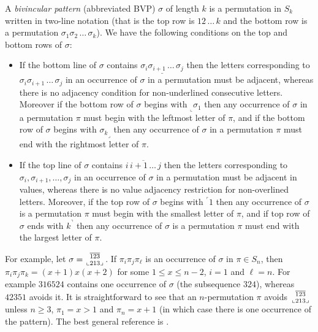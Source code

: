 \documentclass[a4paper]{llncs}
\newcommand{\pmotif}{\sigma}
\newcommand\BV[2]{\genfrac{}{}{0pt}{}{#1}{#2}}
\newcommand{\x}{X}
\newcommand{\y}{Y}
\begin{document}
A \emph{bivincular pattern} (abbreviated BVP) $\sigma$
of length $k$ is a permutation in $S_k$ written in
two-line notation
(that is the top row is $12\,\ldots\,k$ and the bottom row
is a permutation $\sigma_1\sigma_2\,\ldots\,\sigma_k$).
We have the following conditions on the top and bottom rows
of $\sigma$:
\begin{itemize}
	\item
	If the bottom line of $\sigma$ contains
	$\underline{\sigma_i\sigma_{i+1}\,\ldots\,\sigma_j}$
	then the letters corresponding to
	$\sigma_i\sigma_{i+1}\,\ldots\,\sigma_j$ in an occurrence of
	$\sigma$ in a permutation must be adjacent, whereas there is
	no adjacency condition for
	non-underlined consecutive letters.
	Moreover if the bottom row of $\sigma$ begins with
	$_\llcorner{\sigma_1}$ then any occurrence of $\sigma$
	in a permutation $\pi$ must begin with the leftmost
	letter of $\pi$,
	and
	if the bottom row of $\sigma$ begins with
	${\sigma_k}_\lrcorner$ then any occurrence of $\sigma$
	in a permutation $\pi$ must end with the rightmost
	letter of $\pi$.
	\item
	If the top line of $\sigma$ contains
	$\overline{i\,i+1\,\ldots\,j}$ then the letters corresponding to
	$\sigma_i, \sigma_{i+1}, \ldots, \sigma_j$ in an
	occurrence of $\sigma$ in a permutation must be adjacent in values,
	whereas there is no value adjacency restriction for non-overlined
	letters.
	Moreover, if the top row of $\sigma$ begins with
	$^\ulcorner{1}$ then
	any occurrence of $\sigma$ is a permutation $\pi$ must begin with
	the smallest letter of $\pi$, and
	if top row of $\sigma$ ends with $k^\urcorner$ then
	any occurrence of $\sigma$ is a permutation $\pi$ must end with
	the largest letter of $\pi$.
\end{itemize}
For example,
let
$\sigma = \BV{\overline{123}}{\llcorner 213 \lrcorner}$.
If $\pi_i\pi_j\pi_\ell$ is an occurrence of $\sigma$ in $\pi \in S_n$,
then $\pi_i\pi_j\pi_k = (x+1)x(x+2)$ for some $1 \leq x \leq n-2$,
$i=1$ and $\ell = n$.
For example $316524$ contains one occurrence of $\sigma$ (the subsequence $324$),
whereas $42351$ avoids it.
It is straightforward to see that an $n$-permutation
$\pi$ avoids $\BV{\overline{123}}{\llcorner 213 \lrcorner}$ unless
$n \geq 3$,
$\pi_1 = x > 1$
and $\pi_n = x+1$
(in which case there is one occurrence of the pattern).
The best general reference is \cite{Kitaev:book:2011}.

\end{document}
